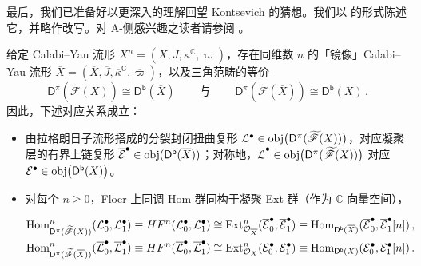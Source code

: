 最后，我们已准备好以更深入的理解回望 Kontsevich 的猜想。我们以 \cite[猜想 7.26]{[Imp21]} 的形式陈述它，并略作改写。对 A-侧感兴趣之读者请参阅 \cite{[Imp21]}。

\begin{Con}\label{HMSconj}		%
	给定 Calabi--Yau 流形 $X^n=(X,J,\kappa^\mathbb{C},\varpi)$，存在同维数 $n$ 的「镜像」Calabi--Yau 流形 $\overline{X}=(\overline{X}, \overline{J},\overline{\kappa}^{\mathbb{C}},\overline{\varpi})$，以及三角范畴的等价
	\begin{equation}\label{HMS}
		\mathsf{D}^\pi(\widetilde{\mathscr{F}}(X))\cong \mathsf{D^b}(\overline{X}) \qquad\,\text{与}\qquad\, \mathsf{D}^\pi(\widetilde{\mathscr{F}}(\overline{X}))\cong \mathsf{D^b}(X)\,.
	\end{equation}
	因此，下述对应关系成立：
	\begin{itemize}[leftmargin=0.5cm]
		\renewcommand{\labelitemi}{\textendash}
		\item 由拉格朗日子流形搭成的分裂封闭扭曲复形 $\mathcal{L}^\bullet\in\textup{obj}\big(\mathsf{D}^\pi(\widetilde{\mathscr{F}}(X))\big)$，对应凝聚层的有界上链复形 $\overline{\mathcal{E}}^\bullet\in\textup{obj}(\mathsf{D^b}(\overline{X}))$；对称地，$\overline{\mathcal{L}}^\bullet\in\textup{obj}\big(\mathsf{D}^\pi(\widetilde{\mathscr{F}}(\overline{X}))\big)$ 对应 $\mathcal{E}^\bullet\in\textup{obj}\big(\mathsf{D^b}(X)\big)$。
		\item 对每个 $n\geq 0$，Floer 上同调 \textup{Hom}-群同构于凝聚 \textup{Ext}-群（作为 $\mathbb{C}$-向量空间），
		\begin{small}\begin{align*}
				& \textup{Hom}_{\mathsf{D}^\pi(\widetilde{\mathscr{F}}(X))}^n(\mathcal{L}_0^\bullet,\mathcal{L}_1^\bullet)\equiv HF^n(\mathcal{L}_0^\bullet,\mathcal{L}_1^\bullet)\cong\textup{Ext}_{\mathcal{O}_{\overline{X}}}^n(\overline{\mathcal{E}}_0^\bullet,\overline{\mathcal{E}}_1^\bullet)\equiv\textup{Hom}_{\mathsf{D^b}(\overline{X})}(\overline{\mathcal{E}}_0^\bullet,\overline{\mathcal{E}}_1^\bullet[n])\,, \\
				&\textup{Hom}_{\mathsf{D}^\pi(\widetilde{\mathscr{F}}(\overline{X}))}^n(\overline{\mathcal{L}}_0^\bullet,\overline{\mathcal{L}}_1^\bullet)\equiv HF^n(\overline{\mathcal{L}}_0^\bullet,\overline{\mathcal{L}}_1^\bullet)\cong\textup{Ext}_{\mathcal{O}_X}^n(\mathcal{E}_0^\bullet,\mathcal{E}_1^\bullet)\equiv\textup{Hom}_{\mathsf{D^b}(X)}(\mathcal{E}_0^\bullet,\mathcal{E}_1^\bullet[n])\,.
		\end{align*}\end{small}

\end{itemize}
\end{Con}

